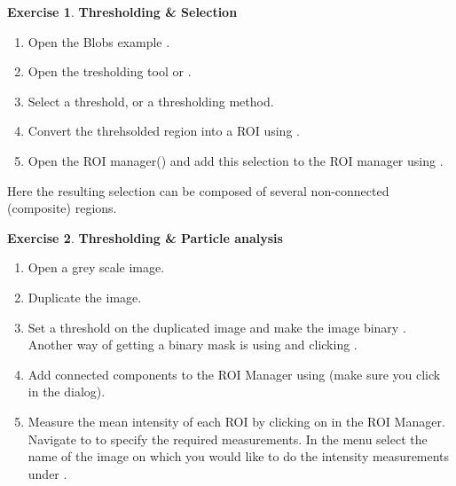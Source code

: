 \documentclass[xcolor=table,DIV=19,twocolumn,10pt]{scrartcl}
\theoremstyle{definition}
\newtheorem{exercice}{Exercise}
\begin{document}
\begin{exercice} \textbf{Thresholding \& Selection}
  \begin{enumerate}
  \item Open the Blobs example .
  \item Open the tresholding tool  or .
  \item Select a threshold, or a thresholding method.
  \item Convert the threhsolded region into a ROI using .
  \item Open the ROI manager() and add this selection to the ROI manager using .
  \end{enumerate}
  Here the resulting selection can be composed of several non-connected (composite) regions.
\end{exercice}

\begin{exercice} \textbf{Thresholding \& Particle analysis}
  \begin{enumerate}
  \item Open a grey scale image.
  \item Duplicate the image.
  \item Set a threshold on the duplicated image and make the image binary . Another way of getting a binary mask is using  and clicking .
  \item Add connected components to the ROI Manager using  (make sure you click  in the  dialog).
  \item Measure the mean intensity of each ROI by clicking on  in the ROI Manager. Navigate to  to specify the required measurements. In the  menu select the name of the image on which you would like to do the intensity measurements under .
  \end{enumerate}
\end{exercice}
\end{document}
